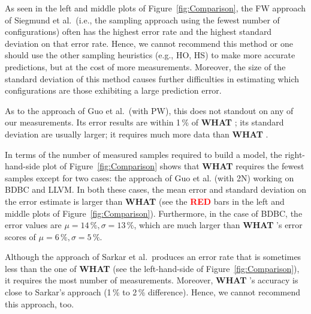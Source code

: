 \documentclass{newsig}
\newcommand{\what}{{\bf WHAT }}
\begin{document}
As seen in the left and middle plots of
Figure~\ref{fig:Comparison}, 
the FW approach of Siegmund et al.\ (i.e., the sampling approach using the fewest number of configurations) often has the highest
error rate and the highest
standard deviation on that error rate. Hence,
we cannot recommend this method or one should use the other sampling heuristics (e.g., HO, HS) to make more accurate predictions, but at the cost of more measurements. Moreover, the size of the standard deviation of this method causes further difficulties in estimating which configurations are those exhibiting a large prediction error. 

As to the approach of Guo et al.\ (with PW), this   does not standout on any of
our measurements. Its error results are within 1\,\% of \what;
 its standard deviation are usually larger; it requires
 much more data than \what.
 
 In terms of the number of measured samples required to build a model, 
 the right-hand-side plot of  Figure~\ref{fig:Comparison}  shows that
 \what requires the fewest samples except for two cases:
 the approach of Guo et al. (with 2N) working on BDBC and LLVM.  In both these cases, the mean error and standard deviation on the error
 estimate is   larger than \what  (see the \textcolor{red}{{\bf RED}} bars in the left and middle plots   of Figure~\ref{fig:Comparison}). Furthermore, in the case of BDBC, the error values
 are  $\mu=14\,\%, \sigma=13\,\%$, which are much larger
than \what's error scores of $\mu=6\,\%, \sigma=5\,\%$. 


Although the approach of Sarkar et al.\ produces an error rate that is sometimes less than the one of \what (see the left-hand-side of
Figure~\ref{fig:Comparison}), it requires the most number of measurements. Moreover, \what's accuracy is close to Sarkar's approach (1\,\%
to 2\,\% difference). Hence, we cannot recommend this approach, too.


 
\end{document}
